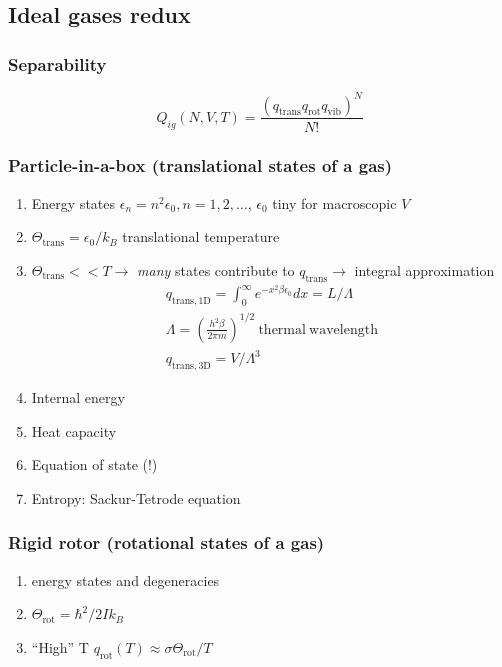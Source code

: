 \documentclass[11pt]{article}
\begin{document}
\subsection{Ideal gases redux}
\label{sec:org926e5f6}
\subsubsection{Separability}
\label{sec:org006cc8d}
    \begin{displaymath}
      Q_{ig}(N,V,T) = \frac{(q_\mathrm{trans}q_\mathrm{rot}q_\mathrm{vib})^N}{N!}
\end{displaymath}

\subsubsection{Particle-in-a-box (translational states of a gas)}
\label{sec:org0bb1581}
\begin{enumerate}
\item Energy states \(\epsilon_n=n^2\epsilon_0, n=1,2, \ldots\),
\(\epsilon_0\) tiny for macroscopic \(V\)
\item \(\Theta_\mathrm{trans} = \epsilon_0/k_B\) translational temperature
\item \(\Theta_\mathrm{trans} << T \rightarrow\) \emph{many} states contribute
to \(q_\mathrm{trans}\rightarrow\) integral approximation
\begin{eqnarray*}
  q_\mathrm{trans,1D} = \int_0^\infty e^{-x^2\beta\epsilon_0}dx =
  L/\Lambda \\
  \Lambda = \left ( \frac{h^2\beta}{2\pi m} \right )^{1/2}\
  \mathrm{thermal\ wavelength} \\
  q_\mathrm{trans,3D} = V/\Lambda^3
\end{eqnarray*}
\item Internal energy
\item Heat capacity
\item Equation of state (!)
\item Entropy: Sackur-Tetrode equation
\end{enumerate}
\subsubsection{Rigid rotor (rotational states of a gas)}
\label{sec:orge31908c}
\begin{enumerate}
\item energy states and degeneracies
\item \(\Theta_\mathrm{rot} = \hbar^2/2 I k_B\)
\item ``High'' T \(q_\mathrm{rot}(T) \approx \sigma \Theta_\mathrm{rot}/T\)
\end{enumerate}
\end{document}
